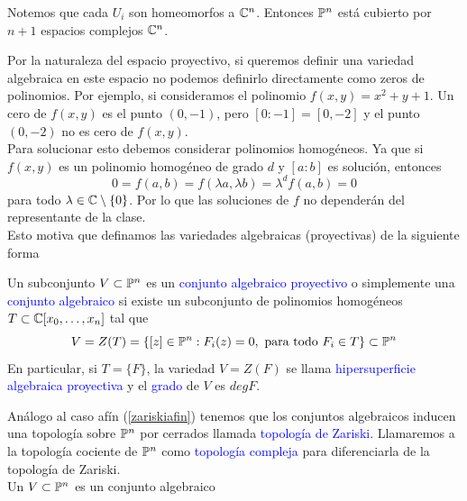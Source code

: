     \begin{remark}
        Notemos que cada $U_i$ son homeomorfos a $\mathbb{C}^n$. Entonces $\mathbb{P}^n$ está cubierto por $n+1$ espacios complejos $\mathbb{C}^n$. 
    \end{remark}

    Por la naturaleza del espacio proyectivo, si queremos definir una variedad algebraica en este espacio no podemos definirlo directamente como zeros de polinomios. Por ejemplo, si consideramos el polinomio $f(x,y)=x^2+y+1$. Un cero de $f(x,y)$ es el punto $(0,-1)$, pero $[0:-1]=[0,-2]$ y el punto $(0,-2)$ no es cero de $f(x,y)$.\\
    Para solucionar esto debemos considerar polinomios homogéneos. Ya que si $f(x,y)$ es un polinomio homogéneo de grado $d$ y $[a:b]$ es solución, entonces
    \begin{equation*}
        0=f(a,b)=f(\lambda a,\lambda b)=\lambda^d f(a,b)=0
    \end{equation*}
    para todo $\lambda\in\mathbb{C}\setminus\{0\}$. Por lo que las soluciones de $f$ no dependerán del representante de la clase.\\
    Esto motiva que definamos las variedades algebraicas  (proyectivas) de la siguiente forma
    \begin{definition}
        Un subconjunto $V\subset \mathbb{P}^n$ es un \textcolor{blue}{conjunto algebraico proyectivo} o simplemente una \textcolor{blue}{conjunto algebraico} si existe un subconjunto de polinomios homogéneos $T\subset\mathbb{C}[x_0,\dots,x_n]$ tal que
        \begin{equation*}
            V=Z(T)=\{[z]\in\mathbb{P}^{n}:F_i(z)=0, \text{ para todo } F_i\in T\}\subset \mathbb{P}^{n}
        \end{equation*}
        En particular, si $T=\{F\}$, la variedad $V=Z(F)$ se llama \textcolor{blue}{hipersuperficie algebraica proyectiva} y el \textcolor{blue}{grado} de $V$ es $deg F$.
    \end{definition}

    \begin{remark}
        Análogo al caso afín (\ref{zariskiafin}) tenemos que los conjuntos algebraicos inducen una topología sobre $\mathbb{P}^n$ por cerrados llamada \textcolor{blue}{topología de Zariski}. Llamaremos a la topología cociente de $\mathbb{P}^n$ como \textcolor{blue}{topología compleja} para diferenciarla de la topología de Zariski.\\
        Un $V\subset\mathbb{P}^n$ es un conjunto algebraico 
    \end{remark}

